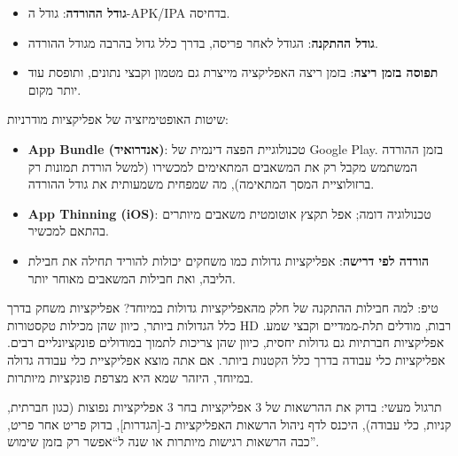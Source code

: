 \begin{itemize}
  \item \textbf{גודל ההורדה}: גודל ה-APK/IPA בדחיסה.
  \item \textbf{גודל ההתקנה}: הגודל לאחר פריסה, בדרך כלל גדול בהרבה מגודל ההורדה.
  \item \textbf{תפוסה בזמן ריצה}: בזמן ריצה האפליקציה מייצרת גם מטמון וקבצי נתונים, ותופסת עוד יותר מקום.
\end{itemize}

שיטות האופטימיזציה של אפליקציות מודרניות:

\begin{itemize}
  \item \textbf{App Bundle (אנדרואיד)}: טכנולוגיית הפצה דינמית של Google Play. בזמן ההורדה המשתמש מקבל רק את המשאבים המתאימים למכשירו (למשל הורדת תמונות רק ברזולוציית המסך המתאימה), מה שמפחית משמעותית את גודל ההורדה.
  \item \textbf{App Thinning (iOS)}: טכנולוגיה דומה; אפל תקצץ אוטומטית משאבים מיותרים בהתאם למכשיר.
  \item \textbf{הורדה לפי דרישה}: אפליקציות גדולות כמו משחקים יכולות להוריד תחילה את חבילת הליבה, ואת חבילות המשאבים מאוחר יותר.
\end{itemize}

\begin{tcbinfo}{טיפ: למה חבילות ההתקנה של חלק מהאפליקציות גדולות במיוחד?}
אפליקציות משחק בדרך כלל הגדולות ביותר, כיוון שהן מכילות טקסטורות HD רבות, מודלים תלת-ממדיים וקבצי שמע. אפליקציות חברתיות גם גדולות יחסית, כיוון שהן צריכות לתמוך במודולים פונקציונליים רבים. אפליקציות כלי עבודה בדרך כלל הקטנות ביותר. אם אתה מוצא אפליקציית כלי עבודה גדולה במיוחד, היזהר שמא היא מצרפת פונקציות מיותרות.

\end{tcbinfo}

\begin{tcbpractice}{תרגול מעשי: בדוק את ההרשאות של 3 אפליקציות}
בחר 3 אפליקציות נפוצות (כגון חברתית, קניות, כלי עבודה), היכנס לדף ניהול הרשאות האפליקציות ב-[הגדרות], בדוק פריט אחר פריט, כבה הרשאות רגישות מיותרות או שנה ל“אפשר רק בזמן שימוש”.

\end{tcbpractice}
